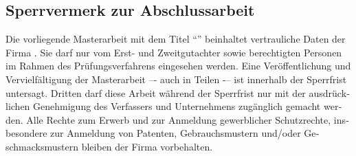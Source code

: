 {\begin{otherlanguage}{ngerman}
{\section*{Sperrvermerk zur Abschlussarbeit}
Die vorliegende Masterarbeit mit dem Titel \enquote{\mytitle} beinhaltet vertrauliche Daten der Firma \textbf{\firmenname}. Sie darf nur vom Erst- und Zweitgutachter sowie berechtigten Personen im Rahmen des Prüfungsverfahrens eingesehen werden. Eine Veröffentlichung und Vervielfältigung der Masterarbeit –- auch in Teilen -– ist innerhalb der Sperrfrist untersagt. Dritten darf diese Arbeit während der Sperrfrist nur mit der ausdrücklichen Genehmigung des Verfassers und Unternehmens zugänglich gemacht werden. Alle Rechte zum Erwerb und zur Anmeldung gewerblicher Schutzrechte, insbesondere zur Anmeldung von Patenten, Gebrauchsmustern und/oder Geschmacksmustern bleiben der Firma \textbf{\firmenname} vorbehalten.
}{}%
\end{otherlanguage}
}%